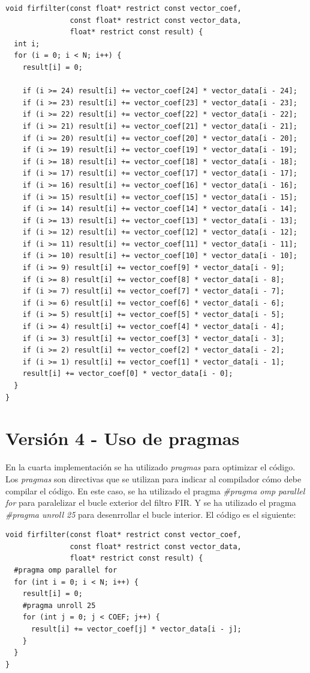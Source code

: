 \documentclass[11pt]{report}
\begin{document}
\begin{lstlisting}
void firfilter(const float* restrict const vector_coef, 
               const float* restrict const vector_data, 
               float* restrict const result) {
  int i;
  for (i = 0; i < N; i++) {
    result[i] = 0;

    if (i >= 24) result[i] += vector_coef[24] * vector_data[i - 24];
    if (i >= 23) result[i] += vector_coef[23] * vector_data[i - 23];
    if (i >= 22) result[i] += vector_coef[22] * vector_data[i - 22];
    if (i >= 21) result[i] += vector_coef[21] * vector_data[i - 21];
    if (i >= 20) result[i] += vector_coef[20] * vector_data[i - 20];
    if (i >= 19) result[i] += vector_coef[19] * vector_data[i - 19];
    if (i >= 18) result[i] += vector_coef[18] * vector_data[i - 18];
    if (i >= 17) result[i] += vector_coef[17] * vector_data[i - 17];
    if (i >= 16) result[i] += vector_coef[16] * vector_data[i - 16];
    if (i >= 15) result[i] += vector_coef[15] * vector_data[i - 15];
    if (i >= 14) result[i] += vector_coef[14] * vector_data[i - 14];
    if (i >= 13) result[i] += vector_coef[13] * vector_data[i - 13];
    if (i >= 12) result[i] += vector_coef[12] * vector_data[i - 12];
    if (i >= 11) result[i] += vector_coef[11] * vector_data[i - 11];
    if (i >= 10) result[i] += vector_coef[10] * vector_data[i - 10];
    if (i >= 9) result[i] += vector_coef[9] * vector_data[i - 9];
    if (i >= 8) result[i] += vector_coef[8] * vector_data[i - 8];
    if (i >= 7) result[i] += vector_coef[7] * vector_data[i - 7];
    if (i >= 6) result[i] += vector_coef[6] * vector_data[i - 6];
    if (i >= 5) result[i] += vector_coef[5] * vector_data[i - 5];
    if (i >= 4) result[i] += vector_coef[4] * vector_data[i - 4];
    if (i >= 3) result[i] += vector_coef[3] * vector_data[i - 3];
    if (i >= 2) result[i] += vector_coef[2] * vector_data[i - 2];
    if (i >= 1) result[i] += vector_coef[1] * vector_data[i - 1];
    result[i] += vector_coef[0] * vector_data[i - 0];
  }
}
\end{lstlisting}

\newpage

\section{Versión 4 - Uso de pragmas}
En la cuarta implementación se ha utilizado \emph{pragmas} para optimizar el código. Los \emph{pragmas} son directivas que se utilizan para
indicar al compilador cómo debe compilar el código. En este caso, se ha utilizado el pragma \emph{\#pragma omp parallel for} para paralelizar el bucle
exterior del filtro FIR. Y se ha utilizado el pragma \emph{\#pragma unroll 25} para desenrrollar el bucle interior. El código es el siguiente:
\begin{lstlisting}
void firfilter(const float* restrict const vector_coef, 
               const float* restrict const vector_data,
               float* restrict const result) {
  #pragma omp parallel for
  for (int i = 0; i < N; i++) {
    result[i] = 0;
    #pragma unroll 25
    for (int j = 0; j < COEF; j++) {
      result[i] += vector_coef[j] * vector_data[i - j];
    }
  }
}
\end{lstlisting}
\end{document}
